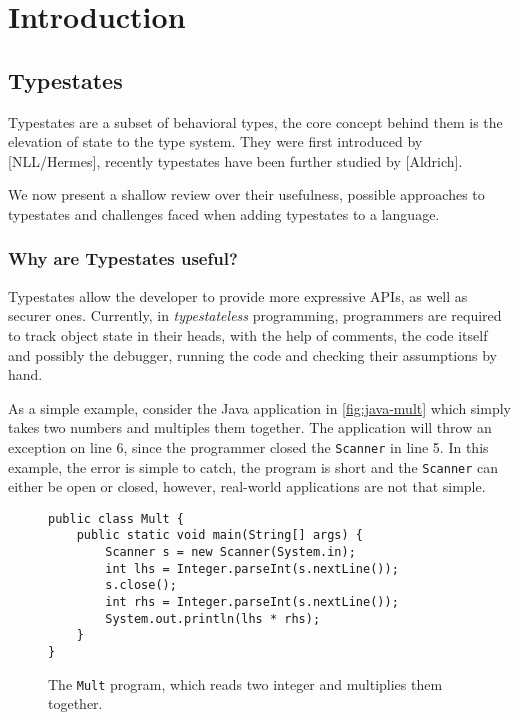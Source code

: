 \chapter{Introduction}\label{cha:introduction}

\section{Typestates}\label{sec:typestates}

Typestates are a subset of behavioral types, the core concept behind them is the elevation of state to the type system.
 They were first introduced by [NLL/Hermes],
recently typestates have been further studied by [Aldrich].

We now present a shallow review over their usefulness,
possible approaches to typestates and challenges faced when adding typestates to a language.


\subsection{Why are Typestates useful?}\label{sec:typestates:why-are-typestates-useful}

Typestates allow the developer to provide more expressive APIs, as well as securer ones.
Currently, in \emph{typestateless} programming,
programmers are required to track object state in their heads, with the help of comments,
the code itself and possibly the debugger, running the code and checking their assumptions by hand.

As a simple example, consider the Java application in \autoref{fig:java-mult} which simply takes two numbers and multiples them together.
The application will throw an exception on line 6,
since the programmer closed the \texttt{Scanner} in line 5.
In this example, the error is simple to catch,
the program is short and the \texttt{Scanner} can either be open or closed,
however, real-world applications are not that simple.

\begin{figure}
    \centering
    \begin{verbatim}
public class Mult {
    public static void main(String[] args) {
        Scanner s = new Scanner(System.in);
        int lhs = Integer.parseInt(s.nextLine());
        s.close();
        int rhs = Integer.parseInt(s.nextLine());
        System.out.println(lhs * rhs);
    }
}
    \end{verbatim}
    \label{fig:java-mult}
    \caption{The \texttt{Mult} program, which reads two integer and multiplies them together.}
\end{figure}


